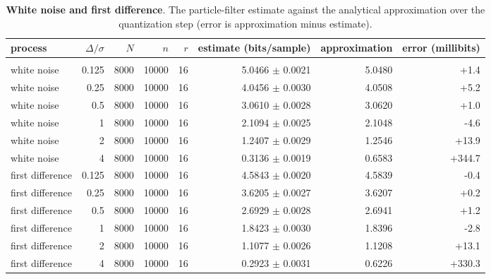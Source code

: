 {\small
\begin{longtable}[]{@{}lrrrrrrr@{}}
\toprule\noalign{}
process & $\Delta/\sigma$ & $N$ & $n$ & $r$ & estimate (bits/sample) & approximation & error (millibits) \\
\midrule\noalign{}
\endhead
\bottomrule\noalign{}
\caption{\textbf{White noise and first difference}. The particle-filter estimate against the analytical approximation over the quantization step (error is approximation minus estimate).}\label{tab:family5}\\
\endlastfoot
white noise & 0.125 & 8000 & 10000 & 16 & 5.0466 $\pm$ 0.0021 & 5.0480 & +1.4 \\
white noise & 0.25 & 8000 & 10000 & 16 & 4.0456 $\pm$ 0.0030 & 4.0508 & +5.2 \\
white noise & 0.5 & 8000 & 10000 & 16 & 3.0610 $\pm$ 0.0028 & 3.0620 & +1.0 \\
white noise & 1 & 8000 & 10000 & 16 & 2.1094 $\pm$ 0.0025 & 2.1048 & -4.6 \\
white noise & 2 & 8000 & 10000 & 16 & 1.2407 $\pm$ 0.0029 & 1.2546 & +13.9 \\
white noise & 4 & 8000 & 10000 & 16 & 0.3136 $\pm$ 0.0019 & 0.6583 & +344.7 \\
first difference & 0.125 & 8000 & 10000 & 16 & 4.5843 $\pm$ 0.0020 & 4.5839 & -0.4 \\
first difference & 0.25 & 8000 & 10000 & 16 & 3.6205 $\pm$ 0.0027 & 3.6207 & +0.2 \\
first difference & 0.5 & 8000 & 10000 & 16 & 2.6929 $\pm$ 0.0028 & 2.6941 & +1.2 \\
first difference & 1 & 8000 & 10000 & 16 & 1.8423 $\pm$ 0.0030 & 1.8396 & -2.8 \\
first difference & 2 & 8000 & 10000 & 16 & 1.1077 $\pm$ 0.0026 & 1.1208 & +13.1 \\
first difference & 4 & 8000 & 10000 & 16 & 0.2923 $\pm$ 0.0031 & 0.6226 & +330.3 \\
\end{longtable}
}
